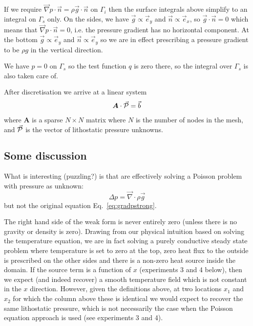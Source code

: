 If we require 
$\vec\nabla p \cdot \vec{n}= \rho \vec{g} \cdot \vec{n}$  on $\Gamma_i$
then the surface integrals above simplify to an integral on $\Gamma_s$ only.
On the sides, we have $\vec{g} \propto \vec{e}_y$ and $\vec{n} \propto \vec{e}_x$, 
so $ \vec{g} \cdot \vec{n}=0$ which means that $\vec\nabla p \cdot \vec{n}=0 $, i.e. 
the pressure gradient has no horizontal component.
At the bottom $\vec{g} \propto \vec{e}_y$ and $\vec{n} \propto \vec{e}_y$ so we are 
in effect prescribing a pressure gradient to be $\rho g$ in the vertical direction. 

We have $p=0$ on $\Gamma_s$ so the test function $q$ is zero there, 
so the integral over $\Gamma_s$ is also taken care of. 

After discretisation we arrive at a linear system 
\begin{equation}
{\bm A}\cdot \vec{\cal P} = \vec{b}
\label{eq:plith}
\end{equation}
where ${\bm A}$ is a sparse $N\times N$ matrix where $N$ is the number of nodes in the mesh, and 
$\vec{\cal P}$ is the vector of lithostatic pressure unknowns.

\subsection*{Some discussion}

What is interesting (puzzling?) is that \textcite{joma22} are effectively solving a Poisson problem with 
pressure as unknown:
\[
\Delta p = \vec\nabla \cdot \rho \vec{g} 
\]
but not the original equation Eq.~\eqref{eq:gradpstrong}.

The right hand side of the weak form is never entirely zero (unless there is no gravity or density
is zero). Drawing from our physical intuition based on solving the temperature equation, 
we are in fact solving a purely conductive steady state problem where temperature is set to 
zero at the top, zero heat flux to the outside is prescribed on the other sides and there is a non-zero heat source 
inside the domain. 
If the source term is a function of $x$ (experiments 3 and 4 below), then 
we expect (and indeed recover) a smooth temperature field which is not constant in the $x$ direction.
However, given the definitions above, at two locations $x_1$ and $x_2$ for which the column above these 
is identical we would expect to recover the same lithostatic pressure, which is not necessarily the case when the Poisson 
equation approach is used (see experiments 3 and 4).

